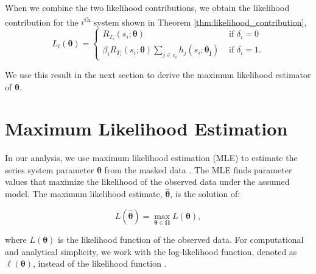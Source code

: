 \documentclass[
]{article}
\begin{document}
When we combine the two likelihood contributions, we obtain the
likelihood contribution for the \(i\)\textsuperscript{th} system shown
in Theorem \ref{thm:likelihood_contribution}, \[
L_i(\boldsymbol{\theta}) =
\begin{cases}
    R_{T_i}(s_i;\boldsymbol{\theta})                      &\text{ if } \delta_i = 0\\
    \beta_i R_{T_i}(s_i;\boldsymbol{\theta})
        \sum_{j\in c_i} h_j(s_i;\boldsymbol{\theta_j})   &\text{ if } \delta_i = 1.
\end{cases}
\]

We use this result in the next section to derive the maximum likelihood
estimator of \(\boldsymbol{\theta}\).

\hypertarget{sec:mle}{%
\section{Maximum Likelihood Estimation}\label{sec:mle}}

In our analysis, we use maximum likelihood estimation (MLE) to estimate
the series system parameter \(\boldsymbol{\theta}\) from the masked data
\citep{bain, casella2002statistical}. The MLE finds parameter values
that maximize the likelihood of the observed data under the assumed
model. The maximum likelihood estimate, \(\hat{\boldsymbol{\theta}}\),
is the solution of:

\begin{equation}
\label{eq:mle}
L(\hat{\boldsymbol{\theta}}) = \max_{\boldsymbol{\theta }\in \boldsymbol{\Omega}} L(\boldsymbol{\theta}),
\end{equation}

where \(L(\boldsymbol{\theta})\) is the likelihood function of the
observed data. For computational and analytical simplicity, we work with
the log-likelihood function, denoted as \(\ell(\boldsymbol{\theta})\),
instead of the likelihood function \citep{casella2002statistical}.
\end{document}
